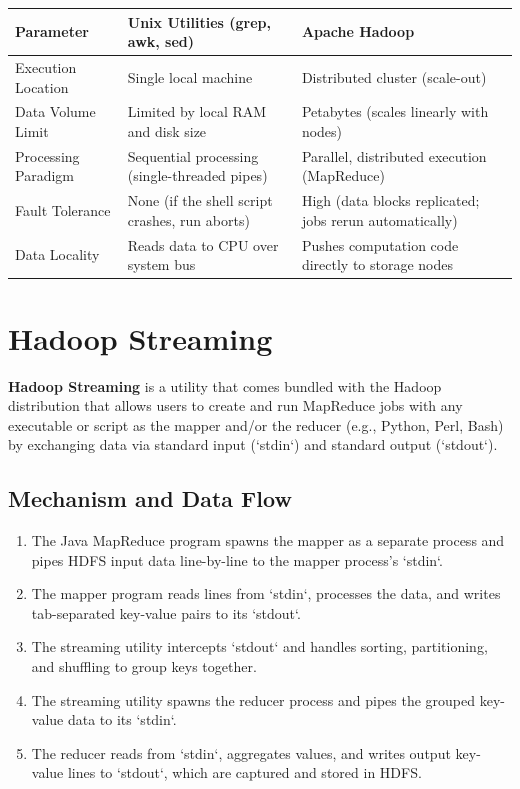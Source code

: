\documentclass[12pt,a4paper]{article}
\renewcommand{\arraystretch}{1.45}
\begin{document}
\par\vspace{6pt}\noindent
{\renewcommand{\arraystretch}{1.4}%
\begin{tabularx}{\linewidth}{|B{3.2cm}|Y|Y|}
\hline
\textbf{Parameter} & \textbf{Unix Utilities (grep, awk, sed)} & \textbf{Apache Hadoop} \\
\hline
Execution Location & Single local machine & Distributed cluster (scale-out) \\
\hline
Data Volume Limit & Limited by local RAM and disk size & Petabytes (scales linearly with nodes) \\
\hline
Processing Paradigm & Sequential processing (single-threaded pipes) & Parallel, distributed execution (MapReduce) \\
\hline
Fault Tolerance & None (if the shell script crashes, run aborts) & High (data blocks replicated; jobs rerun automatically) \\
\hline
Data Locality & Reads data to CPU over system bus & Pushes computation code directly to storage nodes \\
\hline
\end{tabularx}}

\section{Hadoop Streaming}

\begin{tcolorbox}[defbox, title={Hadoop Streaming}]
  \textbf{Hadoop Streaming} is a utility that comes bundled with the Hadoop distribution that allows users to create and run MapReduce jobs with any executable or script as the mapper and/or the reducer (e.g., Python, Perl, Bash) by exchanging data via standard input (`stdin`) and standard output (`stdout`).
\end{tcolorbox}

\subsection{Mechanism and Data Flow}
\begin{enumerate}[leftmargin=*, itemsep=3pt]
  \item The Java MapReduce program spawns the mapper as a separate process and pipes HDFS input data line-by-line to the mapper process's `stdin`.
  \item The mapper program reads lines from `stdin`, processes the data, and writes tab-separated key-value pairs to its `stdout`.
  \item The streaming utility intercepts `stdout` and handles sorting, partitioning, and shuffling to group keys together.
  \item The streaming utility spawns the reducer process and pipes the grouped key-value data to its `stdin`.
  \item The reducer reads from `stdin`, aggregates values, and writes output key-value lines to `stdout`, which are captured and stored in HDFS.
\end{enumerate}
\end{document}
